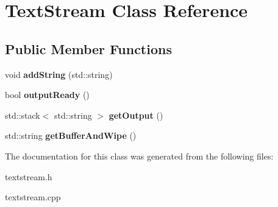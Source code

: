 \hypertarget{classTextStream}{}\section{Text\+Stream Class Reference}
\label{classTextStream}
\subsection*{Public Member Functions}
\begin{DoxyCompactItemize}
\item 
void {\bfseries add\+String} (std\+::string)\hypertarget{classTextStream_ae2d8f969f5d9c6dd9eacabad9112a0b2}{}\label{classTextStream_ae2d8f969f5d9c6dd9eacabad9112a0b2}

\item 
bool {\bfseries output\+Ready} ()\hypertarget{classTextStream_a9f1a3d1dfcf8744c18b4b01d9eadb418}{}\label{classTextStream_a9f1a3d1dfcf8744c18b4b01d9eadb418}

\item 
std\+::stack$<$ std\+::string $>$ {\bfseries get\+Output} ()\hypertarget{classTextStream_a8cfd6ed559bee8bed34cafbe9b7f30e8}{}\label{classTextStream_a8cfd6ed559bee8bed34cafbe9b7f30e8}

\item 
std\+::string {\bfseries get\+Buffer\+And\+Wipe} ()\hypertarget{classTextStream_a1776dc7e16eb1ffcd62dca1f41f727ae}{}\label{classTextStream_a1776dc7e16eb1ffcd62dca1f41f727ae}

\end{DoxyCompactItemize}


The documentation for this class was generated from the following files\+:\begin{DoxyCompactItemize}
\item 
textstream.\+h\item 
textstream.\+cpp\end{DoxyCompactItemize}
